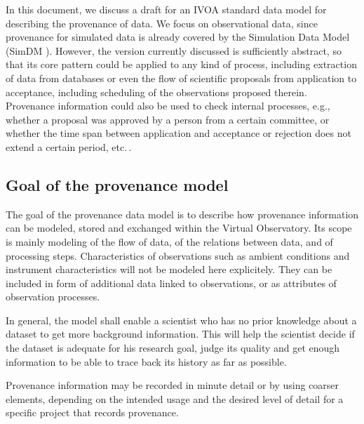 In this document, we discuss a draft for an IVOA standard data model for
describing the provenance of data. We focus on observational data, since
provenance for simulated data is already covered by the Simulation Data Model
(SimDM \citep{std:SimDM}). However, the version currently discussed is
sufficiently abstract, so that its core pattern could be applied to any kind
of process, including extraction of data from 
databases or even the flow of scientific proposals from application to 
acceptance, including scheduling of the observations proposed therein.
Provenance information could also be used to check internal processes,
e.g., whether a proposal was approved by a person from a certain committee,
or whether the time span between application and acceptance or rejection
does not extend a certain period, etc.\,. 


\subsection{Goal of the provenance model}\label{sec:goals}
The goal of the provenance data model is to describe how provenance information
can be modeled, stored and exchanged within the Virtual Observatory. Its scope
is mainly modeling of the flow of data, of the relations between data,
and of processing steps. Characteristics of observations such as ambient
conditions and instrument characteristics will not be modeled here
explicitely. They can be included in form of additional data linked to
observations, or as attributes of observation processes.

In general, the model shall enable a scientist who has no prior knowledge about
a dataset to get more 
background information. This will help the scientist decide if the dataset 
is adequate for his research goal, judge its quality and get enough information
to be able to trace back its history as far as possible. 

Provenance information may be recorded in minute detail or by using coarser
elements, depending on the intended usage and the desired level of detail
for a specific project that records provenance.
